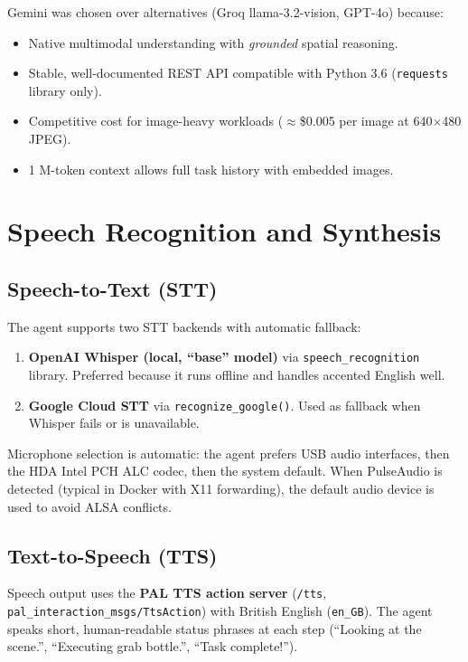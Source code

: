 \documentclass[12pt,a4paper]{report}
\begin{document}
Gemini was chosen over alternatives (Groq llama-3.2-vision, GPT-4o) because:

\begin{itemize}[noitemsep]
  \item Native multimodal understanding with \emph{grounded} spatial reasoning.
  \item Stable, well-documented REST API compatible with Python 3.6 (\texttt{requests} library only).
  \item Competitive cost for image-heavy workloads ($\approx$\$0.005 per image at 640$\times$480 JPEG).
  \item 1 M-token context allows full task history with embedded images.
\end{itemize}

\section{Speech Recognition and Synthesis}

\subsection{Speech-to-Text (STT)}

The agent supports two STT backends with automatic fallback:

\begin{enumerate}[noitemsep]
  \item \textbf{OpenAI Whisper (local, ``base'' model)} via \texttt{speech\_recognition}
        library.  Preferred because it runs offline and handles accented English well.
  \item \textbf{Google Cloud STT} via \texttt{recognize\_google()}.  Used as fallback
        when Whisper fails or is unavailable.
\end{enumerate}

Microphone selection is automatic: the agent prefers USB audio interfaces, then
the HDA Intel PCH ALC codec, then the system default.  When PulseAudio is detected
(typical in Docker with X11 forwarding), the default audio device is used to avoid
ALSA conflicts.

\subsection{Text-to-Speech (TTS)}

Speech output uses the \textbf{PAL TTS action server} (\texttt{/tts},
\texttt{pal\_interaction\_msgs/TtsAction}) with British English (\texttt{en\_GB}).
The agent speaks short, human-readable status phrases at each step
(``Looking at the scene.'', ``Executing grab bottle.'', ``Task complete!'').
\end{document}
